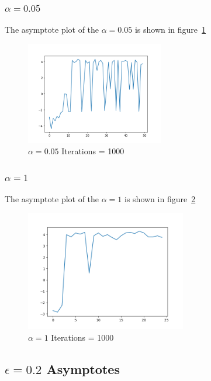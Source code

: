 \documentclass[11pt, a4paper]{article}
\begin{document}
\subsubsection{$\alpha = 0.05$}

The asymptote plot of the $\alpha = 0.05$ is shown in figure~\ref{fig:2_1}

\begin{figure}[htbp] 
	\begin{center}
		\includegraphics[width=6cm]{2_1} 
		\caption{$\alpha = 0.05$ Iterations = 1000} 
		\label{fig:2_1}
	\end{center}
\end{figure}


\subsubsection{$\alpha = 1$}

The asymptote plot of the $\alpha = 1$ is shown in figure~\ref{fig:2_3}

\begin{figure}[htbp] 
	\begin{center}
		\includegraphics[width=7cm]{2_3} 
		\caption{$\alpha = 1$ Iterations = 1000} 
		\label{fig:2_3}
	\end{center}
\end{figure}


\subsection{$\epsilon = 0.2$ Asymptotes}
\end{document}
